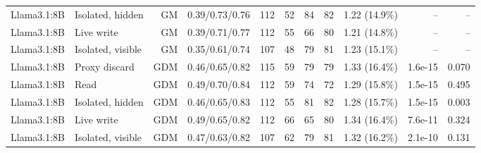 \begin{table}[t]
\begin{tabularx}{\textwidth}{@{}llrYrrrrrrr@{}}
Llama3.1:8B & Isolated, hidden & GM & 0.39/0.73/0.76 & 112 & 52 & 84 & 82 & 1.22 (14.9\%) & -- & -- \\
Llama3.1:8B & Live write & GM & 0.39/0.71/0.77 & 112 & 55 & 66 & 80 & 1.21 (14.8\%) & -- & -- \\
Llama3.1:8B & Isolated, visible & GM & 0.35/0.61/0.74 & 107 & 48 & 79 & 81 & 1.23 (15.1\%) & -- & -- \\
Llama3.1:8B & Proxy discard & GDM & 0.46/0.65/0.82 & 115 & 59 & 79 & 79 & 1.33 (16.4\%) & 1.6e-15 & 0.070 \\
Llama3.1:8B & Read & GDM & 0.49/0.70/0.84 & 112 & 59 & 74 & 72 & 1.29 (15.8\%) & 1.5e-15 & 0.495 \\
Llama3.1:8B & Isolated, hidden & GDM & 0.46/0.65/0.83 & 112 & 55 & 81 & 82 & 1.28 (15.7\%) & 1.5e-15 & 0.003 \\
Llama3.1:8B & Live write & GDM & 0.49/0.65/0.82 & 112 & 66 & 65 & 80 & 1.34 (16.4\%) & 7.6e-11 & 0.324 \\
Llama3.1:8B & Isolated, visible & GDM & 0.47/0.63/0.82 & 107 & 62 & 79 & 81 & 1.32 (16.2\%) & 2.1e-10 & 0.131 \\
\bottomrule\end{tabularx}
\end{table}

